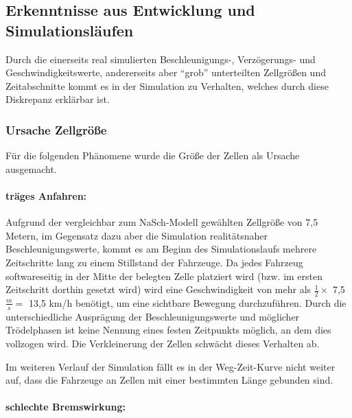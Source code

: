 


\subsection{Erkenntnisse aus Entwicklung und Simulationsläufen}

Durch die einerseits real simulierten Beschleunigungs-, Verzögerungs- und Geschwindigkeitswerte, andererseits aber \enquote{grob} unterteilten Zellgrößen und Zeitabschnitte kommt es in der Simulation zu Verhalten, welches durch diese Diskrepanz erklärbar ist.


\subsubsection{Ursache Zellgröße}

Für die folgenden Phänomene wurde die Größe der Zellen als Ursache ausgemacht.

\paragraph{träges Anfahren:}
\label{sec:accelerategroove}

Aufgrund der vergleichbar zum NaSch-Modell gewählten Zellgröße von 7,5 Metern, im Gegensatz dazu aber die Simulation realitätsnaher Beschleunigungswerte, kommt es am Beginn des Simulationslaufs mehrere Zeitschritte lang zu einem Stillstand der Fahrzeuge.
Da jedes Fahrzeug softwareseitig in der Mitte der belegten Zelle platziert wird (bzw. im ersten Zeitschritt dorthin gesetzt wird) wird eine Geschwindigkeit von mehr als $ \frac{1}{2} \times $ 7,5 $ \frac{m}{s} = $ 13,5 km/h benötigt, um eine sichtbare Bewegung durchzuführen.
Durch die unterschiedliche Ausprägung der Beschleunigungswerte und möglicher Trödelphasen ist keine Nennung eines festen Zeitpunkts möglich, an dem dies vollzogen wird.
Die Verkleinerung der Zellen schwächt dieses Verhalten ab.

Im weiteren Verlauf der Simulation fällt es in der Weg-Zeit-Kurve nicht weiter auf, dass die Fahrzeuge an Zellen mit einer bestimmten Länge gebunden sind.


\paragraph{schlechte Bremswirkung:}
\label{sec:bremsverhalten}

